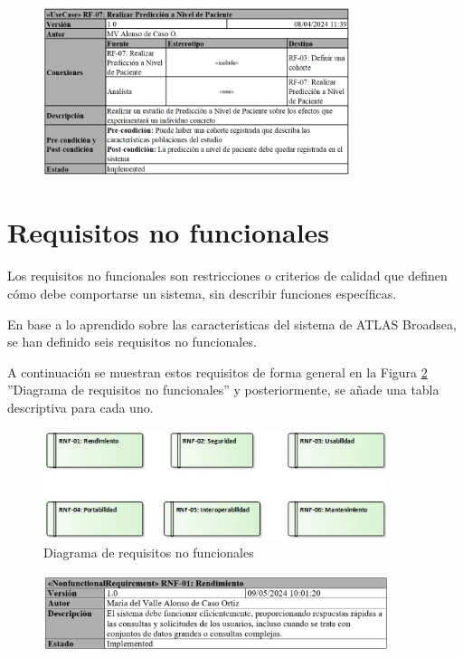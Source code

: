 \begin{figure}[H]
    \centering
    \includegraphics[width=0.80\textwidth]{tables/RF07tab.png}
    \label{table:RF07tab}
\end{figure}


\section{Requisitos no funcionales} \label{sec:06rnf}

Los requisitos no funcionales son restricciones o criterios de calidad que definen cómo debe comportarse un sistema, sin describir funciones específicas.

En base a lo aprendido sobre las características del sistema de ATLAS Broadsea, se han definido seis requisitos no funcionales.

A continuación se muestran estos requisitos de forma general en la Figura \ref{fig:RNFdiagram} ''Diagrama de requisitos no funcionales'' y posteriormente, se añade una tabla descriptiva para cada uno. 

\begin{figure}[H]
    \centering
    \includegraphics[width=0.90\textwidth]{figures/RNFdiagram.jpg}
    \caption{Diagrama de requisitos no funcionales}
    \label{fig:RNFdiagram}
\end{figure}

\begin{figure}[H]
    \centering
    \includegraphics[width=0.90\textwidth]{tables/RNF01.png}
    \label{fig:RNF01}
\end{figure}


